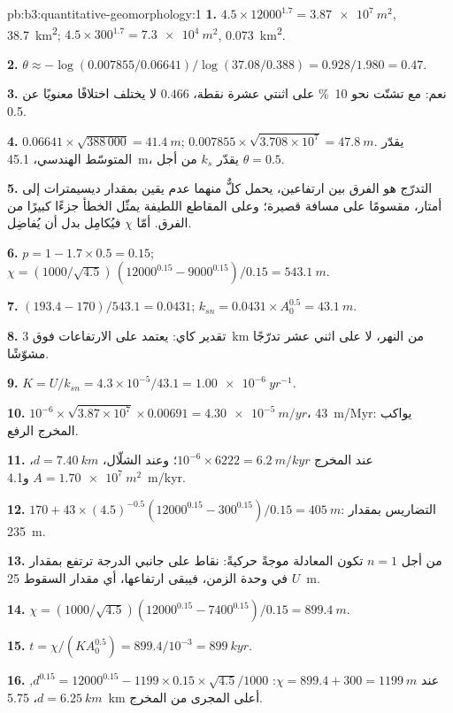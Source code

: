 \begin{solution}{pb:b3:quantitative-geomorphology:1}
\textbf{1.} $4.5\times12000^{1.7} = \qty{3.87e7}{m^2}$, \qty{38.7}{km^2};
$4.5\times300^{1.7} = \qty{7.3e4}{m^2}$, \qty{0.073}{km^2}.

\textbf{2.} $\theta \approx -\log(0.007855/0.06641)/\log(37.08/0.388) =
0.928/1.980 = 0.47$.

\textbf{3.} نعم: مع تشتّت نحو \qty{10}{\percent} على اثنتي عشرة نقطة،
$0.466$ لا يختلف اختلافًا معنويًا عن 0.5.

\textbf{4.} $0.06641\times\sqrt{388\,000} = \qty{41.4}{m}$;
$0.007855\times\sqrt{3.708\times10^7} = \qty{47.8}{m}$. يقدّر المتوسّط الهندسي،
\qty{45.1}{m}، يقدّر $k_s$ من أجل $\theta = 0.5$.

\textbf{5.} التدرّج هو الفرق بين ارتفاعين، يحمل كلٌّ منهما عدم يقين
بمقدار ديسيمترات إلى أمتار، مقسومًا على مسافة قصيرة؛ وعلى المقاطع اللطيفة
يمثّل الخطأ جزءًا كبيرًا من الفرق. أمّا $\chi$ فيُكامِل بدل
أن يُفاضِل.

\textbf{6.} $p = 1 - 1.7\times0.5 = 0.15$; $\chi = (1000/\sqrt{4.5})\,
(12000^{0.15} - 9000^{0.15})/0.15 = \qty{543.1}{m}$.

\textbf{7.} $(193.4 - 170)/543.1 = 0.0431$; $k_{sn} = 0.0431\times A_0^{0.5}
= \qty{43.1}{m}$.

\textbf{8.} تقدير كاي: يعتمد على الارتفاعات فوق \qty{3}{km} من
النهر، لا على اثني عشر تدرّجًا مشوّشًا.

\textbf{9.} $K = U/k_{sn} = 4.3\times10^{-5}/43.1 = \qty{1.00e-6}{yr^{-1}}$.

\textbf{10.} $10^{-6}\times\sqrt{3.87\times10^7}\times0.00691 =
\qty{4.30e-5}{m/yr}$، \qty{43}{m/Myr}: يواكب المخرج
الرفع.

\textbf{11.} عند المخرج $10^{-6}\times6222 = \qty{6.2}{m/kyr}$؛
وعند الشلّال، $d = \qty{7.40}{km}$، $A = \qty{1.70e7}{m^2}$
و\qty{4.1}{m/kyr}.

\textbf{12.} $170 + 43\times(4.5)^{-0.5}(12000^{0.15} - 300^{0.15})/0.15 =
\qty{405}{m}$: التضاريس بمقدار \qty{235}{m}.

\textbf{13.} من أجل $n = 1$ تكون المعادلة موجةً حركيةً: نقاط على جانبي
الدرجة ترتفع بمقدار $U$ في وحدة الزمن، فيبقى ارتفاعها،
أي مقدار السقوط \qty{25}{m}.

\textbf{14.} $\chi = (1000/\sqrt{4.5})(12000^{0.15} - 7400^{0.15})/0.15 =
\qty{899.4}{m}$.

\textbf{15.} $t = \chi/(KA_0^{0.5}) = 899.4/10^{-3} = \qty{899}{kyr}$.

\textbf{16.} عند $\chi = 899.4 + 300 = \qty{1199}{m}$:
$d^{0.15} = 12000^{0.15} - 1199\times0.15\times\sqrt{4.5}/1000$, $d =
\qty{6.25}{km}$، \qty{5.75}{km} أعلى المجرى من المخرج.


\end{solution}
